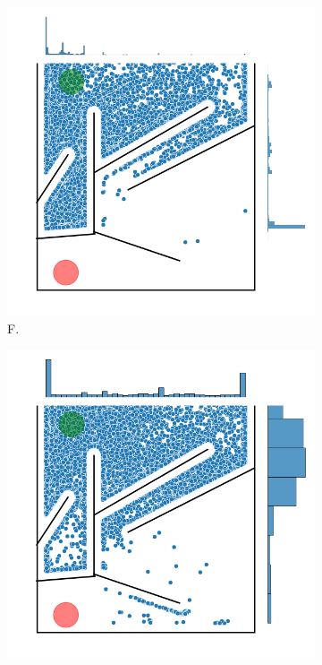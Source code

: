 \begin{figure}[H]
    \begin{mdframed}
        \begin{subfigure}[b]{0.5\textwidth}
            \includegraphics[scale=0.4]{resources/mazes/pure_fitness_open_all_runs.png}
            \caption{F.}
        \end{subfigure}
        \begin{subfigure}[b]{0.5\textwidth}
            \includegraphics[scale=0.4]{resources/mazes/pure_novelty_open_all_runs.png}

\end{subfigure}
\end{mdframed}
\end{figure}
